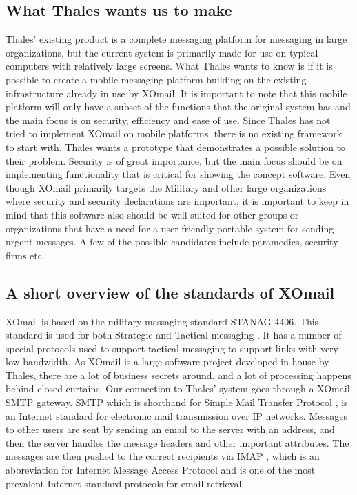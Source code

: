 \subsection*{What Thales wants us to make}
Thales’ existing product is a complete messaging platform for messaging in large organizations, but the current system is primarily made for use on typical computers with relatively large screens. What Thales wants to know is if it is possible to create a mobile messaging platform building on the existing infrastructure already in use by XOmail. It is important to note that this mobile platform will only have a subset of the functions that the original system has and the main focus is on security, efficiency and ease of use.
\newline
\newline
Since Thales has not tried to implement XOmail on mobile platforms, there is no existing framework to start with. Thales wants a prototype that demonstrates a possible solution to their problem. Security is of great importance, but the main focus should be on implementing functionality that is critical for showing the concept software.  
\newline
\newline
Even though XOmail primarily targets the Military and other large organizations where security and security declarations are important, it is important to keep in mind that this software also should be well suited for other groups or organizations that have a need for a user-friendly portable system for sending urgent messages. A few of the possible candidates include paramedics, security firms etc. 

\subsection*{A short overview of the standards of XOmail}
XOmail is based on the military messaging standard STANAG 4406. This standard is used for both Strategic and Tactical messaging \cite{bib:stanag}. It has a number of special protocols used to support tactical messaging to support links with very low bandwidth.
\newline
\newline
As XOmail is a large software project developed in-house by Thales, there are a lot of business secrets around, and a lot of processing happens behind closed curtains. Our connection to Thales’ system goes through a XOmail SMTP gateway. SMTP which is shorthand for Simple Mail Transfer Protocol \cite{bib:smtp}, is an Internet standard for electronic mail transmission over IP networks. Messages to other users are sent by sending an email to the server with an address, and then the server handles the message headers and other important attributes. The messages are then pushed to the correct recipients via IMAP \cite{bib:imap}, which is an abbreviation for Internet Message Access Protocol and is one of the most prevalent Internet standard protocols for email retrieval. 

